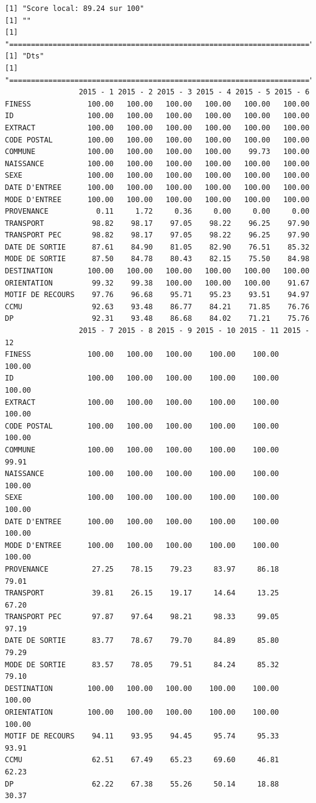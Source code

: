 \documentclass[]{article}
\begin{document}
\begin{verbatim}
[1] "Score local: 89.24 sur 100"
[1] ""
[1] "====================================================================="
[1] "Dts"
[1] "====================================================================="
                 2015 - 1 2015 - 2 2015 - 3 2015 - 4 2015 - 5 2015 - 6
FINESS             100.00   100.00   100.00   100.00   100.00   100.00
ID                 100.00   100.00   100.00   100.00   100.00   100.00
EXTRACT            100.00   100.00   100.00   100.00   100.00   100.00
CODE POSTAL        100.00   100.00   100.00   100.00   100.00   100.00
COMMUNE            100.00   100.00   100.00   100.00    99.73   100.00
NAISSANCE          100.00   100.00   100.00   100.00   100.00   100.00
SEXE               100.00   100.00   100.00   100.00   100.00   100.00
DATE D'ENTREE      100.00   100.00   100.00   100.00   100.00   100.00
MODE D'ENTREE      100.00   100.00   100.00   100.00   100.00   100.00
PROVENANCE           0.11     1.72     0.36     0.00     0.00     0.00
TRANSPORT           98.82    98.17    97.05    98.22    96.25    97.90
TRANSPORT PEC       98.82    98.17    97.05    98.22    96.25    97.90
DATE DE SORTIE      87.61    84.90    81.05    82.90    76.51    85.32
MODE DE SORTIE      87.50    84.78    80.43    82.15    75.50    84.98
DESTINATION        100.00   100.00   100.00   100.00   100.00   100.00
ORIENTATION         99.32    99.38   100.00   100.00   100.00    91.67
MOTIF DE RECOURS    97.76    96.68    95.71    95.23    93.51    94.97
CCMU                92.63    93.48    86.77    84.21    71.85    76.76
DP                  92.31    93.48    86.68    84.02    71.21    75.76
                 2015 - 7 2015 - 8 2015 - 9 2015 - 10 2015 - 11 2015 - 12
FINESS             100.00   100.00   100.00    100.00    100.00    100.00
ID                 100.00   100.00   100.00    100.00    100.00    100.00
EXTRACT            100.00   100.00   100.00    100.00    100.00    100.00
CODE POSTAL        100.00   100.00   100.00    100.00    100.00    100.00
COMMUNE            100.00   100.00   100.00    100.00    100.00     99.91
NAISSANCE          100.00   100.00   100.00    100.00    100.00    100.00
SEXE               100.00   100.00   100.00    100.00    100.00    100.00
DATE D'ENTREE      100.00   100.00   100.00    100.00    100.00    100.00
MODE D'ENTREE      100.00   100.00   100.00    100.00    100.00    100.00
PROVENANCE          27.25    78.15    79.23     83.97     86.18     79.01
TRANSPORT           39.81    26.15    19.17     14.64     13.25     67.20
TRANSPORT PEC       97.87    97.64    98.21     98.33     99.05     97.19
DATE DE SORTIE      83.77    78.67    79.70     84.89     85.80     79.29
MODE DE SORTIE      83.57    78.05    79.51     84.24     85.32     79.10
DESTINATION        100.00   100.00   100.00    100.00    100.00    100.00
ORIENTATION        100.00   100.00   100.00    100.00    100.00    100.00
MOTIF DE RECOURS    94.11    93.95    94.45     95.74     95.33     93.91
CCMU                62.51    67.49    65.23     69.60     46.81     62.23
DP                  62.22    67.38    55.26     50.14     18.88     30.37
\end{verbatim}
\end{document}
